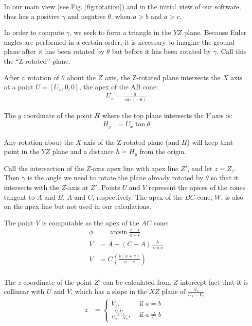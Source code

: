\documentclass{article}
\begin{document}
In our main view (see Fig. \ref{fig:rotation}) and in the initial view
of our software, thus has a positive $\gamma$ and negative $\theta$, when $a > b$ and $a > c$.

In order to compute $\gamma$, we seek to form a triangle in the $YZ$ plane.
Because Euler angles are performed in a certain order, it is necessary to imagine
the ground plane after it has been rotated by $\theta$ but before it has been rotated by $\gamma$.
Call this the ``Z-rotated'' plane.



After a rotation of $\theta$ about the $Z$ axis, the Z-rotated plane intersects the $X$ axis
at a point $U = [U_x,0,0]$, the apex of the AB cone:
\begin{align}
  U_x = \frac{a}{\sin{(-\theta)}}
\end{align}

The $y$ coordinate of the point $H$ where the top plane intersects
the $Y$ axis is:
\begin{align}
  H_y &= U_x \tan{\theta}
\end{align}

Any rotation about the $X$ axis of the Z-rotated plane (and $H$) will keep that
point in the $YZ$ plane and a distance $ h = H_y$ from the origin.

Call the intersection
of the $Z$-axis apex line with apex line $Z'$, and let $z = Z_z$.
Then $\gamma$ is the angle we need to rotate the plane already rotated by $\theta$ so that it intersects with the
$Z$-axis at $Z'$.
Points $U$ and $V$ represent the apices of the cones tangent to $A$ and $B$, $A$ and $C$, respectively.
The apex of the $BC$ cone, $W$, is also on the apex line but not used in our calculations.

The point $V$ is computable as the apex of the $AC$ cone:
\begin{align}
  \phi &= \arcsin{\frac{a - c}{a + c}} \\
  V &= A + (C-A) \frac{b}{\sin{\phi}} \\
  V &= C (\frac{b(a+c)}{a-c}) \\
\end{align}

The $z$ coordinate of the point $Z'$ can be calculated from
$Z$ intercept
fact that it is collinear with $U$ and $V$, which has a slope
in the $XZ$ plane of $\frac{V_z}{U_x-V_x}$:
\begin{align}
  z&= \begin{cases}
    V_z, & \text{ if $a = b$ } \\
    \frac{V_z U_x}{U_x - V_x}, & \text{ if  $a \neq b$}
  \end{cases}
  \label{eq:zprime} \\
\end{align}
\end{document}
